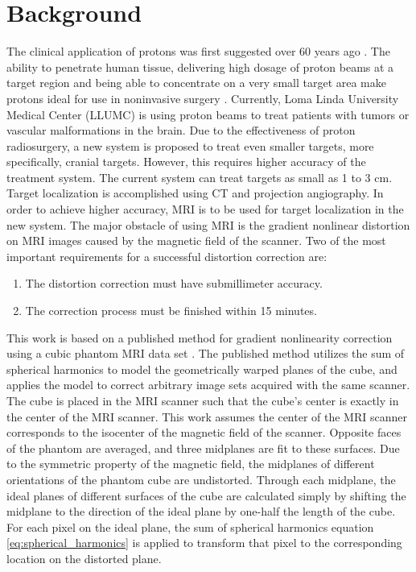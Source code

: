 \section{Background}

The clinical application of protons was first suggested over 60 years ago \cite{Wil46}.
The ability to penetrate human tissue, delivering high dosage of proton beams at a target
region and being able to concentrate on a very small target area make protons ideal for use in noninvasive surgery \cite{Wil46}. Currently, Loma Linda University
Medical Center (LLUMC) is using proton beams to treat patients with tumors or
vascular malformations in the brain.
Due to the effectiveness of proton radiosurgery, a new system is proposed to treat
even smaller targets, more specifically, cranial targets.  However, this requires higher
accuracy of the treatment system. The current system can treat targets as small as 1 to 3 cm.  Target localization is accomplished using CT and projection angiography.
In order to achieve higher accuracy, MRI is to be used for target localization in the new
system. The major obstacle of using MRI is the gradient nonlinear
distortion on MRI images caused by the magnetic field of the scanner.
Two of the most important requirements for a successful distortion correction are:

\begin{enumerate}
\item The distortion correction must have submillimeter accuracy.
\item The correction process must be finished within 15 minutes.
\end{enumerate}


This work is based on a published method for gradient nonlinearity correction using a cubic phantom MRI data set \cite{tom}. The published method utilizes the sum of spherical
harmonics to model the geometrically warped planes of the cube, and applies the model
to correct arbitrary image sets acquired with the same scanner. The cube is
placed in the MRI scanner such that the cube's center is exactly in the center of the MRI scanner.  This work assumes the center of the MRI scanner corresponds to the isocenter of the
magnetic field of the scanner. Opposite faces of the phantom are averaged, and three midplanes are fit to these surfaces.  Due to the symmetric property of the magnetic field,
the midplanes of different orientations of the phantom cube are undistorted.  Through each midplane, the ideal planes of different surfaces
of the cube are calculated simply by shifting the midplane to the direction
of the ideal plane by one-half the length of the cube. For each pixel on
the ideal plane, the sum of spherical
harmonics equation \ref{eq:spherical_harmonics} is applied to transform that pixel to the corresponding location on the distorted plane.

